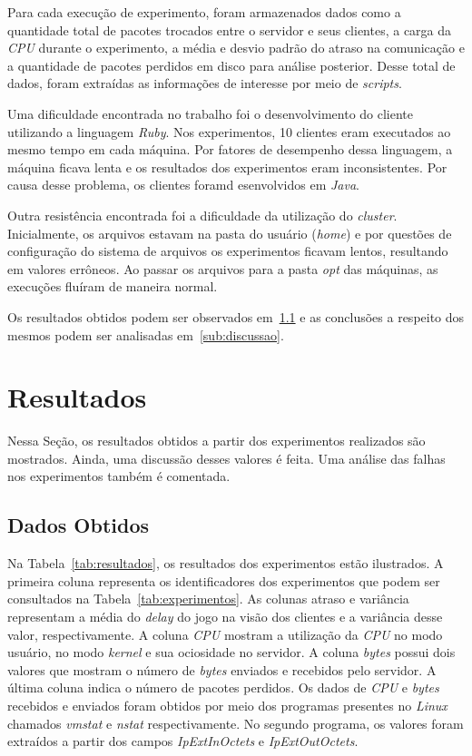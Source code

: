 \documentclass[12pt]{article}
\begin{document}
Para cada execução de experimento, foram armazenados dados como a quantidade
total de pacotes trocados entre o servidor e seus clientes, a carga da \emph{CPU}
durante o experimento, a média e desvio padrão do atraso na comunicação e a
quantidade de pacotes perdidos em disco para análise posterior. Desse total de
dados, foram extraídas as informações de interesse por meio de
\textit{scripts}.

Uma dificuldade encontrada no trabalho foi o desenvolvimento do cliente utilizando a linguagem \emph{Ruby}. Nos experimentos, 10 clientes eram executados ao mesmo tempo em cada máquina. Por fatores de desempenho dessa linguagem, a máquina ficava lenta e os resultados dos experimentos eram inconsistentes. Por causa desse problema, os clientes foramd esenvolvidos em \emph{Java}.

Outra resistência encontrada foi a dificuldade da utilização do \emph{cluster}. Inicialmente, os arquivos estavam na pasta do usuário (\emph{home}) e por questões de configuração do sistema de arquivos os experimentos ficavam lentos, resultando em valores errôneos. Ao passar os arquivos para a pasta \emph{opt} das máquinas, as execuções fluíram de maneira normal. 

Os resultados obtidos podem ser observados em~\ref{sub:dados} e as conclusões a
respeito dos mesmos podem ser analisadas em~\ref{sub:discussao}.

\section{Resultados} \label{sec:resultados}

Nessa Seção, os resultados obtidos a partir dos experimentos realizados são mostrados. Ainda, uma discussão desses valores é feita. Uma análise das falhas nos experimentos também é comentada.

\subsection{Dados Obtidos} \label{sub:dados}

Na Tabela~\ref{tab:resultados}, os resultados dos experimentos estão ilustrados. A primeira coluna representa os identificadores dos experimentos que podem ser consultados na Tabela~\ref{tab:experimentos}. As colunas atraso e variância representam a média do \emph{delay} do jogo na visão dos clientes e a variância desse valor, respectivamente. A coluna \emph{CPU} mostram a utilização da \emph{CPU} no modo usuário, no modo \emph{kernel} e sua ociosidade no servidor. A coluna \emph{bytes} possui dois valores que mostram o número de \emph{bytes} enviados e recebidos pelo servidor. A última coluna indica o número de pacotes perdidos. Os dados de \emph{CPU} e \emph{bytes} recebidos e enviados foram obtidos por meio dos programas presentes no \emph{Linux} chamados \emph{vmstat} \cite{Vmstat} e \emph{nstat} \cite{nstat} respectivamente. No segundo programa, os valores foram extraídos a partir dos campos \emph{IpExtInOctets} e \emph{IpExtOutOctets}.
\end{document}
